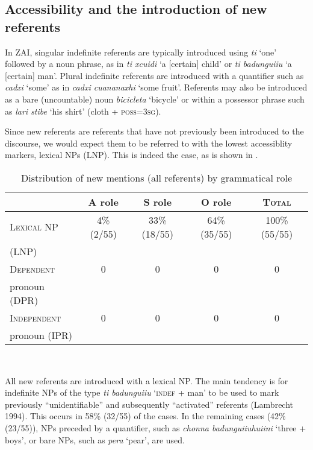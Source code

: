 \subsection{Accessibility and the introduction of new referents}\label{accessiblityandnew}

In ZAI, singular indefinite referents are typically introduced using \textit{ti} `one' followed by a noun phrase, as in \textit{ti xcuidi} `a {[}certain{]} child' or \textit{ti badunguiiu} `a {[}certain{]} man'. Plural indefinite referents are introduced with a quantifier such as \textit{cadxi} `some' as in \textit{cadxi cuananaxhi} `some fruit'. Referents may also be introduced as a bare (uncountable) noun \textit{bicicleta} `bicycle'  or within a possessor phrase such as \textit{lari stibe} `his shirt' (cloth + \textsc{poss}=3\textsc{sg}).


Since new referents are referents that have not previously been introduced to the discourse, we would expect them to be referred to with the lowest accessiblity markers, lexical NPs (LNP). This is indeed the case, as is shown in .

\begin{table}[htp]  
\begin{center}
\caption{\small{Distribution of new mentions (all referents) by grammatical role}}
\begin{tabular}{| l | c | c | c | c |}\hline
 & A role & S role & O role & \textsc{Total} \\
\hline
 \textsc{Lexical NP} & 4{\%} (2/55) & 33{\%} (18/55) & 64{\%} (35/55) & 100{\%} (55/55) \\
 (LNP) & & & & \\
\hline
 \textsc{Dependent} & 0 & 0  &  0 &  0  \\
pronoun (DPR) & & & & \\
\hline
 \textsc{Independent} & 0 & 0  & 0 &  0 \\
 pronoun (IPR) & & & & \\
\hline
\end{tabular}\\
\label{newreferents}
\end{center}
\end{table} 
All new referents are introduced with a lexical NP. The main tendency is for indefinite NPs of the type \textit{ti badunguiiu} {`}\textsc{indef} + man{'} to be used to mark previously ``unidentifiable'' and subsequently ``activated'' referents (Lambrecht 1994). This occurs in 58{\%} (32/55) of the cases. In the remaining cases (42{\%} (23/55)), NPs preceded by a quantifier, such as \textit{chonna badunguiiuhuiini} {`}three + boys{'}, or bare NPs, such as \textit{pera} `pear', are used. 

